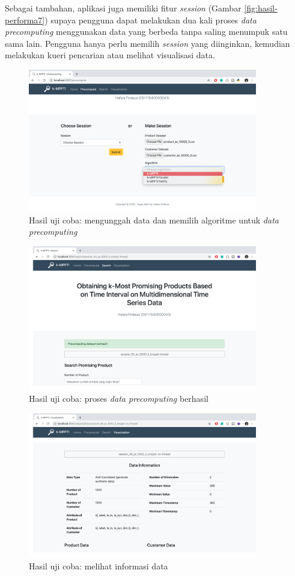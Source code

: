 Sebagai tambahan, aplikasi juga memiliki fitur \textit{session} (Gambar \ref{fig:hasil-performa7}) supaya pengguna dapat melakukan dua kali proses \textit{data precomputing} menggunakan data yang berbeda tanpa saling menumpuk satu sama lain. Pengguna hanya perlu memilih \textit{session} yang diinginkan, kemudian melakukan kueri pencarian atau melihat visualisasi data. \\

\begin{figure}[H]
	\centering
	\includegraphics[width=10cm]{assets/img/bab5/hasil2.png}
	\caption{Hasil uji coba: mengunggah data dan memilih algoritme untuk \textit{data precomputing}}
	\label{fig:hasil-performa1}
\end{figure}

\begin{figure}[H]
	\centering
	\includegraphics[width=10cm]{assets/img/bab5/hasil1.png}
	\caption{Hasil uji coba: proses \textit{data precomputing} berhasil}
	\label{fig:hasil-performa2}
\end{figure}

\begin{figure}[H]
	\centering
	\includegraphics[width=10cm]{assets/img/bab5/hasil3.png}
	\caption{Hasil uji coba: melihat informasi data}
	\label{fig:hasil-performa3}
\end{figure}

